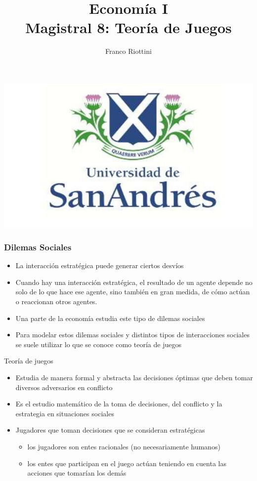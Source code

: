\documentclass{beamer}
\title[Economía I]{Economía I \vspace{4mm}
\\ Magistral 8: Teoría de Juegos}
\date{}
\author[Riottini]{Franco Riottini}
\institute[]{Universidad de San Andrés}
\begin{document}
\begin{frame}
\titlepage
\centering
\includegraphics[scale=0.2]{../Figures/logoUDESA.jpg} 
\end{frame}

\begin{frame}
\frametitle{Dilemas Sociales}
\begin{itemize}
    \item La interacción estratégica puede generar ciertos desvíos
    \item Cuando hay una interacción estratégica, el resultado de un agente
    depende no solo de lo que hace ese agente, sino también en
    gran medida, de cómo actúan o reaccionan otros agentes.
    \item Una parte de la economía estudia este tipo de dilemas sociales
    \item Para modelar estos dilemas sociales y distintos tipos de interacciones sociales se suele utilizar lo que se conoce como teoría de juegos
    \end{itemize}
\end{frame}

\begin{frame}{Teoría de juegos}
    \begin{itemize}
        \item Estudia de manera formal y abstracta las decisiones óptimas que deben tomar diversos adversarios en conflicto
        \item Es el estudio matemático de la toma de decisiones, del conflicto y la estrategia en situaciones sociales
        \item Jugadores que toman decisiones que se consideran estratégicas
        \begin{itemize}
            \item los jugadores son entes racionales (no necesariamente humanos)
            \item los entes que participan en el juego actúan teniendo en cuenta las acciones que tomarían los demás
        \end{itemize}
    \end{itemize}
\end{frame}
\end{document}
